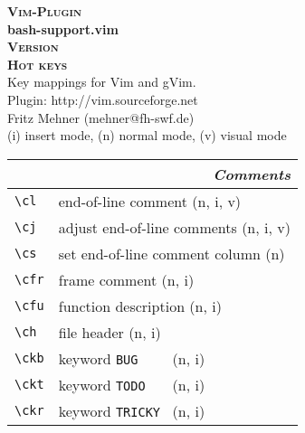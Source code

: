 \documentclass[oneside,11pt,a4paper,DIV18]{scrartcl}
\begin{document}
\begin{center}
\textbf{\textsc{\small{Vim-Plugin}}}\\
\textbf{\LARGE{bash-support.vim}}\\
\textbf{\textsc{\small{Version \PluginVersion}}}\\
\vspace{3mm}%
\textbf{\textsc{\huge{Hot keys}}}\\ 
\vspace{3mm}%
\footnotesize{Key mappings for Vim and gVim.}\\
\footnotesize{Plugin: http://vim.sourceforge.net}\\
\footnotesize{Fritz Mehner (mehner@fh-swf.de)}\\
{\normalsize (i)} insert mode, {\normalsize (n)} normal mode, {\normalsize (v)} visual mode\\
\vspace{3.5mm}
\small
\begin{tabular}[]{|p{11mm}|p{59mm}|}
\hline
\multicolumn{2}{|r|}{\textsl{\textbf{C}omments}}\\
\hline \verb'\cl'  & end-of-line comment              \hfill (n, i, v)\\
\hline \verb'\cj'  & adjust end-of-line comments      \hfill (n, i, v)\\
\hline \verb'\cs'  & set end-of-line comment column   \hfill (n)\\
\hline \verb'\cfr' & frame comment                    \hfill (n, i)\\
\hline \verb'\cfu' & function description             \hfill (n, i)\\
\hline \verb'\ch'  & file header                      \hfill (n, i)\\
\hline \verb'\ckb' & keyword \verb'BUG    '           \hfill (n, i)\\
\hline \verb'\ckt' & keyword \verb'TODO   '           \hfill (n, i)\\
\hline \verb'\ckr' & keyword \verb'TRICKY '           \hfill (n, i)\\

\end{tabular}
\end{center}
\end{document}
